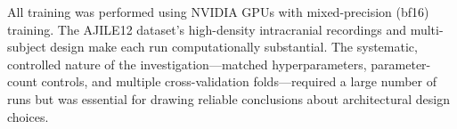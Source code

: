 \documentclass[11pt, a4paper]{article}
\begin{document}
All training was performed using NVIDIA GPUs with mixed-precision (bf16) training. The AJILE12 dataset's high-density intracranial recordings and multi-subject design make each run computationally substantial. The systematic, controlled nature of the investigation---matched hyperparameters, parameter-count controls, and multiple cross-validation folds---required a large number of runs but was essential for drawing reliable conclusions about architectural design choices.




\end{document}
